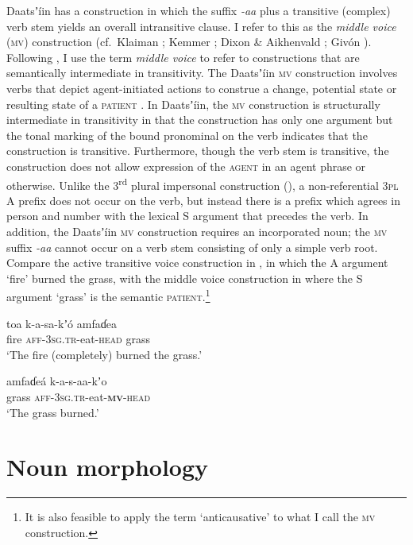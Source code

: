 \documentclass[output=paper]{langsci/langscibook}
\begin{document}
Daatsʼíin has a construction in which the suffix \textit{{}-aa }plus a transitive (complex) verb stem yields an overall intransitive clause. I refer to this as the \textit{middle voice} (\textsc{mv}) construction (cf.\ Klaiman \citeyear[44-45]{Klaiman1991}; Kemmer \citeyear[3-4]{Kemmer1993}; Dixon \& Aikhenvald \citeyear[12]{DixonAikhenvald2000}; Giv\'on \citeyear[116-121]{Givon2001}). Following \citet[3]{Kemmer1993}, I use the term \textit{middle voice} to refer to constructions that are semantically intermediate in transitivity. The Daatsʼíin\textsc{ mv} construction involves verbs that depict agent-initiated actions to construe a change, potential state or resulting state of a \textsc{patient} \citep[cf.][116]{Givon2001}. In Daatsʼíin, the \textsc{mv }construction is structurally intermediate in transitivity in that the construction has only one argument but the tonal marking of the bound pronominal on the verb indicates that the construction is transitive. Furthermore, though the verb stem is transitive, the construction does not allow expression of the \textsc{agent} in an agent phrase or otherwise. Unlike the 3\textsuperscript{rd} plural impersonal construction (), a non-referential 3\textsc{pl} A prefix does not occur on the verb, but instead there is a prefix which agrees in person and number with the lexical S argument that precedes the verb. In addition, the Daatsʼíin \textsc{mv} construction requires an incorporated noun; the \textsc{mv} suffix \textit{{}-aa} cannot occur on a verb stem consisting of only a simple verb root. Compare the active transitive voice construction in , in which the A argument ‘fire’ burned the grass, with the middle voice construction in  where the S argument ‘grass’ is the semantic \textsc{patient}.\footnote{It is also feasible to apply the term ‘anticausative’ \citep[cf.][7]{DixonAikhenvald2000} to what I call the \textsc{mv }construction.}  

\ea\label{ex:ahlandc:47}
\gll
toa    k-a-sa-kʼ\'{o}  amfaɗea \\
fire  \textsc{aff-3sg.tr-}eat\textsc{{}-head}  grass \\  
\glt
‘The fire (completely) burned the grass.’  
\z

\ea\label{ex:ahlandc:48}
\gll
amfaɗeá k-a-s-aa-kʼo \\
grass       \textsc{aff-3sg.tr}{}-eat-\textbf{\textsc{mv}}\textsc{{}-head} \\
\glt
‘The grass burned.’
\z


\section{Noun morphology}\label{sec:ahlandc:7}
\end{document}
